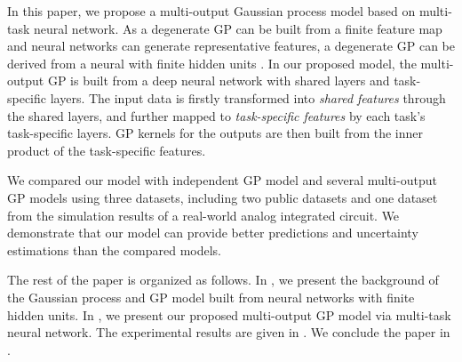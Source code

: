 In this paper, we propose a multi-output Gaussian process model based on multi-task neural network. As a degenerate GP can be built from a finite feature map and neural networks can generate representative features, a degenerate GP can be derived from a neural with finite hidden units \cite{lazaro2010marginalized, huang2015scalable}. In our proposed model, the multi-output GP is built from a deep neural network with shared layers and task-specific layers. The input data is firstly transformed into \emph{shared features} through the shared layers, and further mapped to \emph{task-specific features} by each task's task-specific layers. GP kernels for the outputs are then built from the inner product of the task-specific features.

We compared our model with independent GP model and several multi-output GP models using three datasets, including two public datasets and one dataset from the simulation results of a real-world analog integrated circuit. We demonstrate that our model can provide better predictions and uncertainty estimations than the compared models.

The rest of the paper is organized as follows. In , we present the background of the Gaussian process and GP model built from neural networks with finite hidden units. In , we present our proposed multi-output GP model via multi-task neural network. The experimental results are given in . We conclude the paper in .

